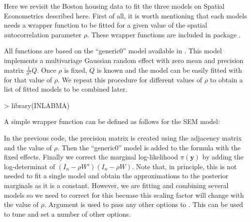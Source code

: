 \documentclass[article]{jss}
\begin{document}
Here we revisit the Boston housing data to fit the three models on Spatial
Econometrics described here. First of all, it is worth mentioning that each
models needs a wrapper function to be fitted for a given value of the
spatial autocorrelation parameter $\rho$. These wrapper functions are
included in  package .

All functions are based on the ``generic0'' model available in  .
This model implements a multivariage Gaussian random effect with zero mean
and precision matrix $\frac{1}{\sigma^2} Q$. Once $\rho$ is fixed, $Q$ is
known and the model can be easily fitted with  for that value of
$\rho$. We repeat this procedure for different values of $\rho$ to
obtain a list of fitted models to be combined later.

\begin{Schunk}
\begin{Sinput}
> library(INLABMA)
\end{Sinput}
\end{Schunk}

A simple wrapper function can be defined as follows for the SEM model:

\begin{Schunk}
\end{Schunk}

In the previous code, the precision matrix is created using the adjacency
matrix and the value of $\rho$. Then the ``generic0'' model is added to the
formula with the fixed effects. Finally we correct the marginal log-likelihood
$\pi(\mathbf{y})$ by adding the log-determinat of $(I_n-\rho W')(I_n-\rho W)$.
Note that, in principle, this is not needed to fit a single model and obtain
the approximations to the posterior marginals as it is a constant. However, we
are fitting and combining several models so we need to correct for this
becuase this scaling factor will change with the value of $\rho$.
Argument  is used to pass any other options to . 
This can be used to tune and set a number of other options.
\end{document}
